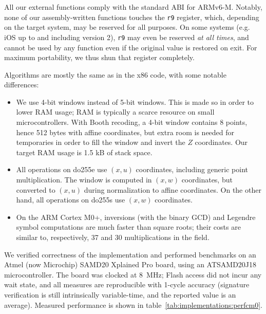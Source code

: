 \documentclass{llncs}
\begin{document}
All our external functions comply with the standard ABI for ARMv6-M.
Notably, none of our assembly-written functions touches the \verb+r9+
register, which, depending on the target system, may be reserved for all
purposes. On some systems (e.g. iOS up to and including version 2),
\verb+r9+ may even be reserved \emph{at all times}, and cannot be used
by any function even if the original value is restored on exit. For
maximum portability, we thus shun that register completely.

Algorithms are mostly the same as in the x86 code, with some notable
differences:
\begin{itemize}

    \item We use 4-bit windows instead of 5-bit windows. This is made so
    in order to lower RAM usage; RAM is typically a scarce resource on
    small microcontrollers. With Booth recoding, a 4-bit window contains
    8 points, hence 512 bytes with affine coordinates, but extra room is
    needed for temporaries in order to fill the window and invert the
    $Z$ coordinates. Our target RAM usage is 1.5 kB of stack space.

    \item All operations on do255e use $(x, u)$ coordinates, including
    generic point multiplication. The window is computed in $(x, w)$
    coordinates, but converted to $(x, u)$ during normalization to
    affine coordinates. On the other hand, all operations on do255s
    use $(x, w)$ coordinates.

    \item On the ARM Cortex M0+, inversions (with the binary GCD) and
    Legendre symbol computations are much faster than square roots;
    their costs are similar to, respectively, 37 and 30 multiplications
    in the field.

\end{itemize}

We verified correctness of the implementation and performed benchmarks
on an Atmel (now Microchip) SAMD20 Xplained Pro board, using an
ATSAMD20J18 micro\-con\-trol\-ler\cite{SAMD20}. The board was clocked at
8~MHz; Flash access did not incur any wait state, and all measures are
reproducible with 1-cycle accuracy (signature verification is still
intrinsically variable-time, and the reported value is an average).
Measured performance is shown in
table~\ref{tab:implementations:perfcm0}.
\end{document}
